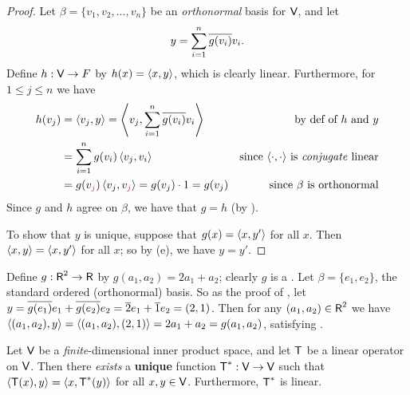 \begin{proof}
Let \(\beta = \{ v_1, v_2, ..., v_n \}\) be an \emph{orthonormal} basis for \(\textsf{V}\), and let
\[
    y = \sum_{i = 1}^n \overline{g(v_i)} v_i.
\]
Define \(h: \textsf{V} \to F\) by \(h(x) = \left< x, y \right>\), which is clearly linear.
Furthermore, for \(1 \le j \le n\) we have
\begin{align*}
    h(v_j) & = \LG v_j, y \RG = \LG v_j, \sum_{i = 1}^n \conjugatet{g(v_i)} v_i \RG & \text{by def of \(h\) and \(y\)} \\
        & = \sum_{i = 1}^n g(v_i) \LG v_j, v_i \RG & \text{since \(\InnerOp\) is \emph{conjugate} linear} \\
        & = g(v_{\RED{j}}) \LG v_j, v_{\RED{j}} \RG = g(v_j) \cdot 1 = g(v_j) & \text{since \(\beta\) is orthonormal}
\end{align*}
Since \(g\) and \(h\) agree on \(\beta\), we have that \(g = h\) (by ).

To show that \(y\) is unique, suppose that \(g(x) = \left< x, y' \right>\) for all \(x\).
Then \(\left< x, y \right> = \left< x, y' \right>\) for all \(x\);
so by (e), we have \(y = y'\).
\end{proof}

\begin{example} \label{example 6.3.1}
Define \(g : \textsf{R}^2 \to \textsf{R}\) by \(g(a_1, a_2) = 2a_1 + a_2\); clearly \(g\) is a \LTRAN{}.
Let \(\beta = \{ e_1, e_2 \}\), the standard ordered (orthonormal) basis.
So as the proof of , let \(y = \overline{g(e_1)}e_1 + \overline{g(e_2)}e_2 = \overline{2} e_1 + \overline{1} e_2 = (2, 1)\).
Then for any \((a_1, a_2) \in \textsf{R}^2\) we have \(\left< (a_1, a_2), y \right> = \left< (a_1, a_2), (2, 1) \right> = 2 a_1 + a_2 = g(a_1, a_2)\), satisfying .
\end{example}

\begin{theorem} \label{thm 6.9}
Let \(\textsf{V}\) be a \emph{finite}-dimensional inner product space, and let \(\textsf{T}\) be a linear operator on \(\textsf{V}\).
Then there \emph{exists} a \textbf{unique} function \(\textsf{T}^*: \textsf{V} \to \textsf{V}\) such that \(\left< \textsf{T}(x), y \right> = \left< x, \textsf{T}^*(y) \right>\) for all \(x, y \in \textsf{V}\).
Furthermore, \(\textsf{T}^*\) is linear.
\end{theorem}

